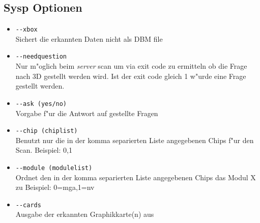 \subsection{Sysp Optionen}
\begin{itemize}
\item \verb+--xbox+\\
Sichert die erkannten Daten nicht als DBM file

\item \verb+--needquestion+\\
Nur m"oglich beim \textit{server} scan um via exit
code zu ermitteln ob die Frage nach 3D gestellt werden wird.
Ist der exit code gleich 1 w"urde eine Frage gestellt werden.

\item \verb+--ask (yes/no)+\\
Vorgabe f"ur die Antwort auf gestellte Fragen

\item \verb+--chip (chiplist)+\\
Benutzt nur die in der komma separierten Liste angegebenen Chips
f"ur den Scan. Beispiel: 0,1

\item \verb+--module (modulelist)+\\
Ordnet den in der komma separierten Liste angegebenen Chips das 
Modul X zu Beispiel: 0=mga,1=nv

\item \verb+--cards+\\
Ausgabe der erkannten Graphikkarte(n) aus

\end{itemize}
